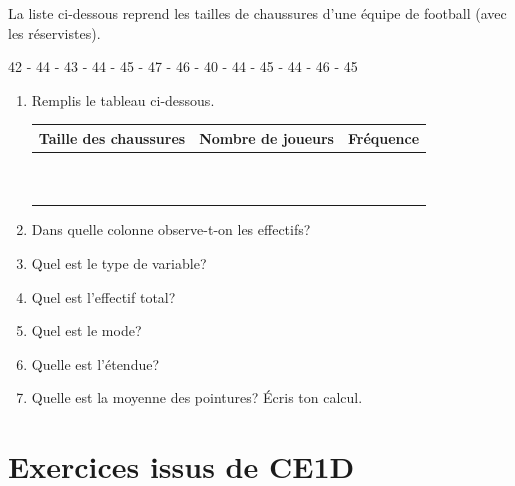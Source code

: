 \documentclass[../math2.tex]{subfiles}
\begin{document}
\newpage
\begin{exercise}
  La liste ci-dessous reprend les tailles de chaussures d’une équipe de football (avec les réservistes).
  \begin{center}
     42  -  44  -  43  -  44  -  45  -  47  -  46  -  40  -  44  -  45  -  44  -  46  -  45 
  \end{center}
  \begin{enumerate}[itemsep=1cm]
      \item Remplis le tableau ci-dessous. \\
      {\renewcommand{\arraystretch}{1.7}
      \begin{tabularx}{\linewidth}{|Y|Y|Y|}
        \hline
          Taille des chaussures & Nombre de joueurs & Fréquence \\
          \hline 
          & & \\
          \hline 
          & & \\
          \hline 
          & & \\
          \hline 
          & & \\
          \hline 
          & & \\
          \hline 
          & & \\
          \hline 
          & & \\
          \hline 
          & & \\
          \hline 
          & & \\
          \hline 
          & & \\
          \hline
      \end{tabularx}}
      \item Dans quelle colonne observe-t-on les effectifs?
      \item Quel est le type de variable?
      \item Quel est l'effectif total?
      \item Quel est le mode?
      \item Quelle est l'étendue?
      \item Quelle est la moyenne des pointures? Écris ton calcul.
  \end{enumerate}

\end{exercise}

\newpage
\section{Exercices issus de CE1D}
\end{document}
